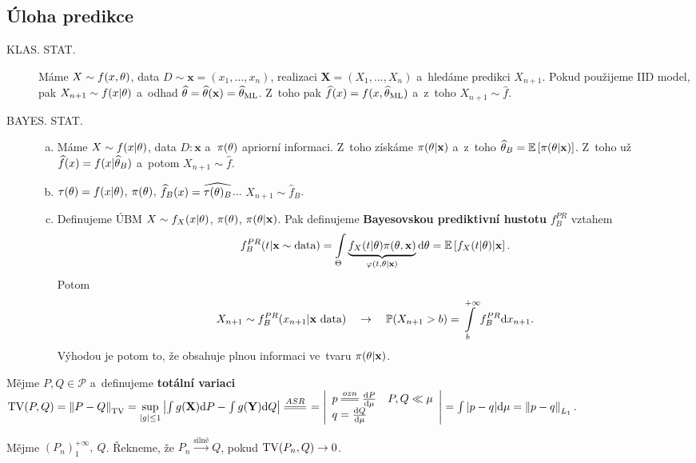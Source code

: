 \subsection*{Úloha predikce}
	\begin{description}
	\item[KLAS. STAT.] Máme $X\sim f(x,\theta)$, data $D\sim\textbf{x}=(x_1,...,x_n)$, realizaci $\textbf{X}=(X_1,...,X_n)$ a~hledáme predikci $X_{n+1}$. Pokud použijeme IID model, pak $X_{n+1}\sim f(x|\theta)$ a~odhad $\widehat{\theta}=\widehat{\theta}(\textbf{x})=\widehat{\theta}_{\mathrm{ML}}$. Z~toho pak $\widehat{f}(x)=f(x,\widehat{\theta}_\mathrm{ML})$ a~z~toho $X_{n+1}\sim\widehat{f}$.
	\item[BAYES. STAT.] \begin{enumerate}[a)]
		\item Máme $X\sim f(x|\theta)$, data $D:\textbf{x}$ a~$\pi(\theta)$ apriorní informaci. Z~toho získáme $\pi(\theta|\textbf{x})$ a~z~toho $\widehat{\theta}_B=\mathbb{E}\left[ \pi(\theta|\textbf{x}) \right]$. Z~toho už $\widehat{f}(x)=f(x|\widehat{\theta}_B)$ a~potom $X_{n+1}\sim\widehat{f}$.
		\item $\tau(\theta)=f(x|\theta)$, $\pi(\theta)$, $\widehat{f}_B(x)=\widehat{\tau(\theta)_B}$... $X_{n+1}\sim\widehat{f}_B$.
		\item Definujeme ÚBM $X\sim f_X(x|\theta)$, $\pi(\theta)$, $\pi(\theta|\textbf{x})$. Pak definujeme \textbf{Bayesovskou prediktivní hustotu} $f_B^{PR} $ vztahem
		$$ f_B^{PR}(t|\textbf{x}\sim\text{data})=\int\limits_{\Theta} \underbrace{f_X(t|\theta)\pi(\theta,\textbf{x})}_{\varphi(t,\theta|\textbf{x})}\mathrm{d}\theta=\mathbb{E}\left[ f_X(t|\theta)|\textbf{x} \right].$$
		Potom
		$$ X_{n+1}\sim f_B^{PR}(x_{n+1}|\textbf{x}\text{ data})\quad\to\quad \mathbb{P}(X_{n+1}>b)=\int\limits_b^{+\infty}f_B^{PR}\mathrm{d} x_{n+1}.$$
		Výhodou je potom to, že obsahuje plnou informaci ve~tvaru $\pi(\theta|\textbf{x})$.
	\end{enumerate}
\end{description}
\begin{define}
	Mějme $P,Q\in\mathcal{P}$ a~definujeme \textbf{totální variaci} $\TV(P,Q)=\left\|P-Q\right\|_\TV=\sup\limits_{|g|\leq 1}\left| \int g(\X)\d P-\int g(\Y)\d Q \right|\equal{ASR}=\left|\begin{array}{l}
	p\equal{ozn}\frac{\d P}{\d \mu}\quad P,Q\ll\mu\\ q=\frac{\d Q}{\d \mu}
\end{array}
\right|=\int |p-q|\d\mu=\left\|p-q\right\|_{L_1}$.
\end{define}
\begin{define}
	Mějme $(P_n)_1^{+\infty},~Q$. Řekneme, že $P_n\stackrel{\text{silně}}{\longrightarrow}Q$, pokud $\mathrm{TV}(P_n,Q)\to0$.
\end{define}
